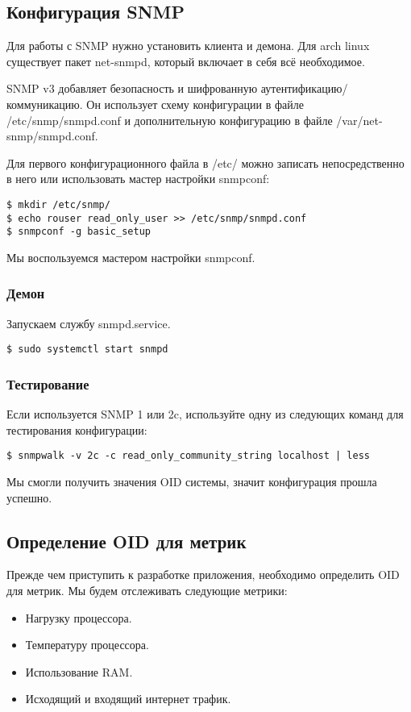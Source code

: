 \subsection*{Конфигурация SNMP}

Для работы с SNMP нужно установить клиента и демона. Для arch linux существует пакет
net-snmpd, который включает в себя всё необходимое.

SNMP v3 добавляет безопасность и шифрованную аутентификацию/коммуникацию.
Он использует схему конфигурации в файле /etc/snmp/snmpd.conf и дополнительную
конфигурацию в файле /var/net-snmp/snmpd.conf.

Для первого конфигурационного файла в /etc/ можно записать непосредственно
в него или использовать мастер настройки snmpconf:

\begin{verbatim}
$ mkdir /etc/snmp/
$ echo rouser read_only_user >> /etc/snmp/snmpd.conf
$ snmpconf -g basic_setup
\end{verbatim}

Мы воспользуемся мастером настройки snmpconf.

\subsubsection*{Демон}

Запускаем службу snmpd.service.
\begin{verbatim}
$ sudo systemctl start snmpd
\end{verbatim}

\subsubsection*{Тестирование}
Если используется SNMP 1 или 2c, используйте одну из следующих команд для тестирования конфигурации:

\begin{verbatim}
$ snmpwalk -v 2c -c read_only_community_string localhost | less
\end{verbatim}

Мы смогли получить значения OID системы, значит конфигурация прошла успешно.

\subsection*{Определение OID для метрик}

Прежде чем приступить к разработке приложения, необходимо определить OID для метрик.
Мы будем отслеживать следующие метрики:
\begin{itemize}
    \item Нагрузку процессора.
    \item Температуру процессора.
    \item Использование RAM.
    \item Исходящий и входящий интернет трафик.
\end{itemize}

